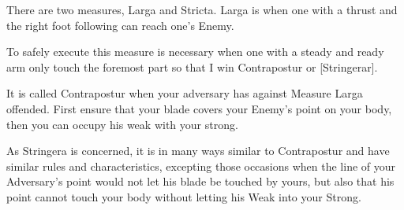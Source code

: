 \newpage


\newpage


 There are two measures, Larga and Stricta. Larga is when one with
 a thrust and the right foot following can reach one's Enemy.

To safely execute this measure is necessary when one with a steady and
ready arm only touch the foremost part so that I win Contrapostur or
[Stringerar].

It is called Contrapostur when your adversary has against Measure
Larga offended. First ensure that your blade covers your Enemy's point
on your body, then you can occupy his weak with your strong.

%
As Stringera is concerned, it is in many ways similar to Contrapostur
and have similar rules and characteristics, excepting those occasions
when the line of your Adversary's point would not let his blade be
touched by yours, but also that his point cannot touch your body
without letting his Weak into your Strong.

